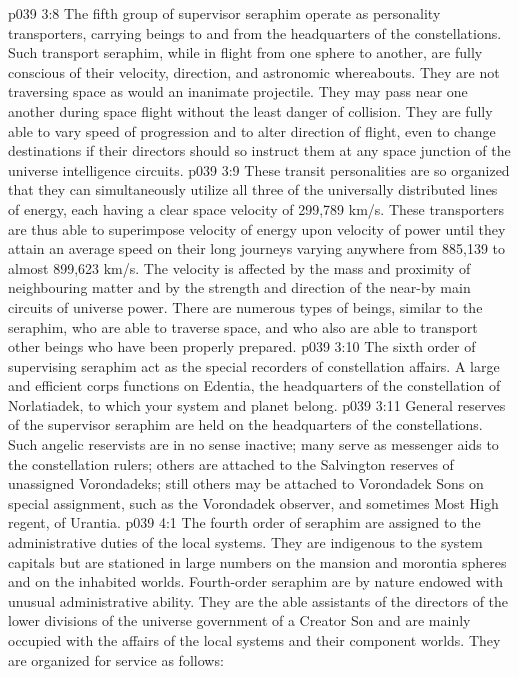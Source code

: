 \vs p039 3:8 \bibnobreakspace {} The fifth group of supervisor seraphim operate as personality transporters, carrying beings to and from the headquarters of the constellations. Such transport seraphim, while in flight from one sphere to another, are fully conscious of their velocity, direction, and astronomic whereabouts. They are not traversing space as would an inanimate projectile. They may pass near one another during space flight without the least danger of collision. They are fully able to vary speed of progression and to alter direction of flight, even to change destinations if their directors should so instruct them at any space junction of the universe intelligence circuits.
\vs p039 3:9 These transit personalities are so organized that they can simultaneously utilize all three of the universally distributed lines of energy, each having a clear space velocity of 299,789 km/s. These transporters are thus able to superimpose velocity of energy upon velocity of power until they attain an average speed on their long journeys varying anywhere from 885,139 to almost 899,623 km/s. The velocity is affected by the mass and proximity of neighbouring matter and by the strength and direction of the near\hyp{}by main circuits of universe power. There are numerous types of beings, similar to the seraphim, who are able to traverse space, and who also are able to transport other beings who have been properly prepared.
\vs p039 3:10 \bibnobreakspace {} The sixth order of supervising seraphim act as the special recorders of constellation affairs. A large and efficient corps functions on Edentia, the headquarters of the constellation of Norlatiadek, to which your system and planet belong.
\vs p039 3:11 \bibnobreakspace {} General reserves of the supervisor seraphim are held on the headquarters of the constellations. Such angelic reservists are in no sense inactive; many serve as messenger aids to the constellation rulers; others are attached to the Salvington reserves of unassigned Vorondadeks; still others may be attached to Vorondadek Sons on special assignment, such as the Vorondadek observer, and sometimes Most High regent, of Urantia.
\vs p039 4:1 The fourth order of seraphim are assigned to the administrative duties of the local systems. They are indigenous to the system capitals but are stationed in large numbers on the mansion and morontia spheres and on the inhabited worlds. Fourth\hyp{}order seraphim are by nature endowed with unusual administrative ability. They are the able assistants of the directors of the lower divisions of the universe government of a Creator Son and are mainly occupied with the affairs of the local systems and their component worlds. They are organized for service as follows:
